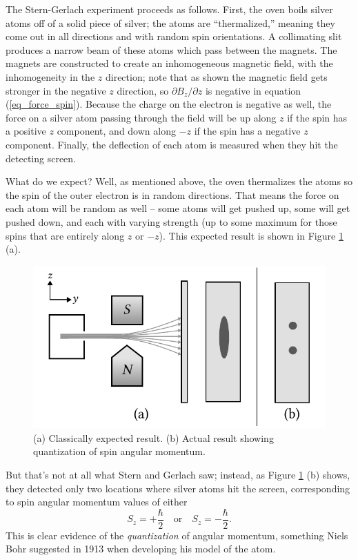 The Stern-Gerlach experiment proceeds as follows.  First, the oven boils silver atoms off of a solid piece of silver; the atoms are ``thermalized,'' meaning they come out in all directions and with random spin orientations.  A collimating slit produces a narrow beam of these atoms which pass between the magnets.  The magnets are constructed to create an inhomogeneous magnetic field, with the inhomogeneity in the $z$ direction; note that as shown the magnetic field gets stronger in the negative $z$ direction, so $\partial B_z / \partial z$ is negative in equation (\ref{eq_force_spin}).  Because the charge on the electron is negative as well, the force on a silver atom passing through the field will be up along $z$ if the spin has a positive $z$ component, and down along $-z$ if the spin has a negative $z$ component.  Finally, the deflection of each atom is measured when they hit the detecting screen.

What do we expect?  Well, as mentioned above, the oven thermalizes the atoms so the spin of the outer electron is in random directions.  That means the force on each atom will be random as well -- some atoms will get pushed up, some will get pushed down, and each with varying strength (up to some maximum for those spins that are entirely along $z$ or $-z$).  This expected result is shown in Figure \ref{fig_stern_gerlach_result_expected} (a).

\begin{figure}
\centering\includegraphics[width=0.8\linewidth]{Figures/Chapter 1/fig_stern_gerlach_result_expected.pdf}
\caption{(a) Classically expected result.  (b) Actual result showing quantization of spin angular momentum.}
\label{fig_stern_gerlach_result_expected}
\end{figure}

But that's not at all what Stern and Gerlach saw; instead, as Figure \ref{fig_stern_gerlach_result_expected} (b) shows, they detected only two locations where silver atoms hit the screen, corresponding to spin angular momentum values of either 
\[
S_z = +\frac{\hbar}{2} \quad \text{or} \quad S_z = -\frac{\hbar}{2}.
\]
This is clear evidence of the \emph{quantization} of angular momentum, something Niels Bohr suggested in 1913 when developing his model of the atom.

